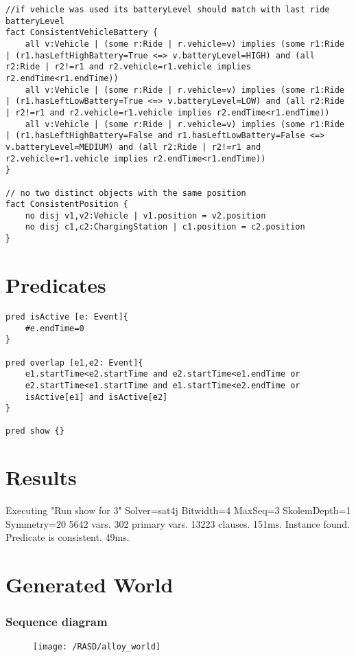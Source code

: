 \begin{lstlisting}
//if vehicle was used its batteryLevel should match with last ride batteryLevel
fact ConsistentVehicleBattery {
	all v:Vehicle | (some r:Ride | r.vehicle=v) implies (some r1:Ride | (r1.hasLeftHighBattery=True <=> v.batteryLevel=HIGH) and (all r2:Ride | r2!=r1 and r2.vehicle=r1.vehicle implies r2.endTime<r1.endTime))  
	all v:Vehicle | (some r:Ride | r.vehicle=v) implies (some r1:Ride | (r1.hasLeftLowBattery=True <=> v.batteryLevel=LOW) and (all r2:Ride | r2!=r1 and r2.vehicle=r1.vehicle implies r2.endTime<r1.endTime))  
	all v:Vehicle | (some r:Ride | r.vehicle=v) implies (some r1:Ride | (r1.hasLeftHighBattery=False and r1.hasLeftLowBattery=False <=> v.batteryLevel=MEDIUM) and (all r2:Ride | r2!=r1 and r2.vehicle=r1.vehicle implies r2.endTime<r1.endTime))
}

// no two distinct objects with the same position
fact ConsistentPosition {
	no disj v1,v2:Vehicle | v1.position = v2.position
	no disj c1,c2:ChargingStation | c1.position = c2.position
}
\end{lstlisting}
\section{Predicates}
\begin{lstlisting}
pred isActive [e: Event]{
	#e.endTime=0
}

pred overlap [e1,e2: Event]{
	e1.startTime<e2.startTime and e2.startTime<e1.endTime or 
	e2.startTime<e1.startTime and e1.startTime<e2.endTime or
	isActive[e1] and isActive[e2]
}

pred show {}
\end{lstlisting}
\section{Results}
Executing "Run show for 3"
   Solver=sat4j Bitwidth=4 MaxSeq=3 SkolemDepth=1 Symmetry=20
   5642 vars. 302 primary vars. 13223 clauses. 151ms.
   Instance found. Predicate is consistent. 49ms.
\section{Generated World}
\subsubsection{Sequence diagram}
\begin{figure}[!ht]
  \centering
  \vspace{0.2cm}
  \texttt{[image: /RASD/alloy\_world]}\\
  \vspace{0.2cm}
  \label{fig:alloy_world} 
\end{figure}
